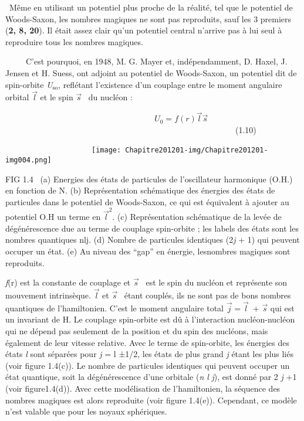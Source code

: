 \documentclass[a4paper]{article}
\providecommand\textsubscript[1]{\ensuremath{{}_{\text{#1}}}}
\begin{document}
\ Même en utilisant un potentiel plus proche de la réalité, tel que le potentiel de Woods-Saxon, les nombres magiques ne
sont pas reproduits, sauf les 3 premiers (\textbf{2, 8, 20}). Il était assez clair qu’un potentiel central n’arrive pas
à lui seul à reproduire tous les nombres magiques.

\ \ \ \ \ C’est pourquoi, en 1948, M. G. Mayer et, indépendamment, D. Haxel, J. Jensen et H. Suess, ont adjoint au
potentiel de Woods-Saxon, un potentiel dit de spin-orbite \textit{U}\textsubscript{so}, reflétant l’existence d’un
couplage entre le moment angulaire orbital $\overrightarrow l$ et le spin  $\overrightarrow s$ \ du nucléon :

\textbf{\ \ \ \ \ \ \ \ \ \ \ \ \ \ \ \ \ \ \ \ \ \ \ \ \ \ \ \ \ \ \ } $U_0=f(r)\overrightarrow l\overrightarrow
s$\ \ \ \ \ \ \ \ \ \ \ \ \ \ \ \ \ \ \ \ \ \ \ \ \ \ \ \ \ \ \ \ \ \ \ \ \ \ \ \ \ \ \ \ \ \ \ \ \ \ \ \ \ \ \ \ (1.10)


\bigskip


\bigskip


\bigskip


\bigskip


\bigskip


\bigskip


\bigskip

\ \ \ \ \ \ \ \ \ \ \ \ \ \ \ \ \ \ \ \ \ 
\texttt{[image: Chapitre201201-img/Chapitre201201-img004.png]} 


\bigskip

FIG 1.4 \ (a) Energies des états de particules de l’oscillateur harmonique (O.H.) en fonction de N. (b) Représentation
schématique des énergies des états de particules dans le potentiel de Woods-Saxon, ce qui est équivalent à ajouter au
potentiel O.H un terme en $\overrightarrow l^2$. (c) Représentation schématique de la levée de dégénérescence due au
terme de couplage spin-orbite ; les labels des états sont les nombres quantiques nlj. (d) Nombre de particules
identiques (2\textit{j} + 1) qui peuvent occuper un état. (e) Au niveau des “gap” en énergie, lesnombres magiques sont
reproduits.

\textit{f}(r) est la constante de couplage et  $\overrightarrow s$ \ est le spin du nucléon et représente son mouvement
intrinsèque. $\overrightarrow l$ et  $\overrightarrow s$ \ étant couplés, ils ne sont pas de bons nombres quantiques de
l’hamiltonien. C’est le moment angulaire total  $\overrightarrow j=\overrightarrow l$\ + $\overrightarrow s$ qui est un
invariant de H. Le couplage spin-orbite est dû à l’interaction nucléon-nucléon qui ne dépend pas seulement de la
position et du spin des nucléons, mais également de leur vitesse relative. Avec le terme de spin-orbite, les énergies
des états \textit{l} sont séparées pour \textit{j} = l ±1/2, les états de plus grand \textit{j} étant les plus liés
(voir figure 1.4(c)). Le nombre de particules identiques qui peuvent occuper un état quantique, soit la dégénérescence
d’une orbitale (\textit{n l} \textit{j}), est donné par 2 \textit{j} +1 (voir figure1.4(d)). Avec cette modélisation de
l’hamiltonien, la séquence des nombres magiques est alors reproduite (voir figure 1.4(e)). Cependant, ce modèle n’est
valable que pour les noyaux sphériques.
\end{document}
